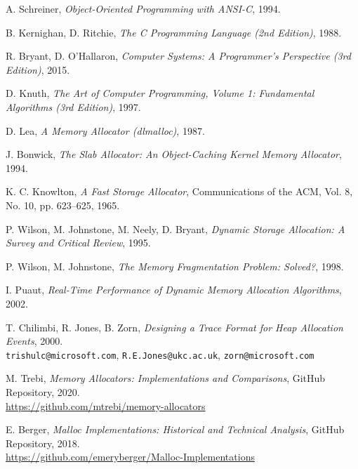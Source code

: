 \begin{thebibliography}{9}

  A. Schreiner, \emph{Object-Oriented Programming with ANSI-C}, 1994.

  B. Kernighan, D. Ritchie, \emph{The C Programming Language (2nd Edition)}, 1988.

  R. Bryant, D. O’Hallaron, \emph{Computer Systems: A Programmer’s Perspective (3rd Edition)}, 2015.

  D. Knuth, \emph{The Art of Computer Programming, Volume 1: Fundamental Algorithms (3rd Edition)}, 1997.

  D. Lea, \emph{A Memory Allocator (dlmalloc)}, 1987.

  J. Bonwick, \emph{The Slab Allocator: An Object-Caching Kernel Memory Allocator}, 1994.

    K. C. Knowlton, \emph{A Fast Storage Allocator}, Communications of the ACM, Vol. 8, No. 10, pp. 623–625, 1965.

  P. Wilson, M. Johnstone, M. Neely, D. Bryant, \emph{Dynamic Storage Allocation: A Survey and Critical Review}, 1995.

  P. Wilson, M. Johnstone, \emph{The Memory Fragmentation Problem: Solved?}, 1998.

  I. Puaut, \emph{Real-Time Performance of Dynamic Memory Allocation Algorithms}, 2002.

  T. Chilimbi, R. Jones, B. Zorn, \emph{Designing a Trace Format for Heap Allocation Events}, 2000. \\
  \texttt{trishulc@microsoft.com}, \texttt{R.E.Jones@ukc.ac.uk}, \texttt{zorn@microsoft.com}

  M. Trebi, \emph{Memory Allocators: Implementations and Comparisons}, GitHub Repository, 2020. \\
  \url{https://github.com/mtrebi/memory-allocators}

  E. Berger, \emph{Malloc Implementations: Historical and Technical Analysis}, GitHub Repository, 2018. \\
  \url{https://github.com/emeryberger/Malloc-Implementations}

\end{thebibliography}